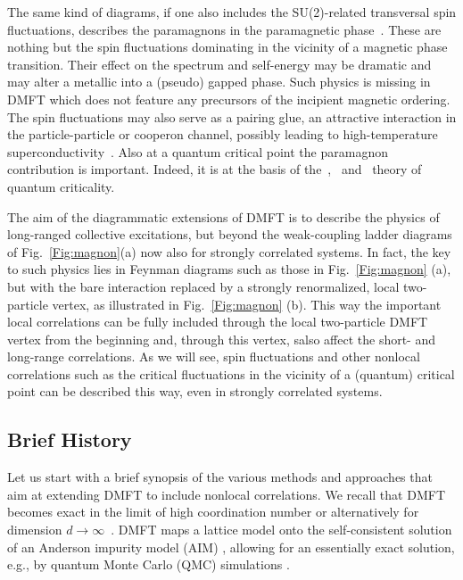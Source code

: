 \documentclass[rmp,aps,reprint,amsmath,amssymb,superscriptaddress,showpacs,nofootinbib]{revtex4-1}
\begin{document}
The same kind of diagrams, if one also includes the SU(2)-related transversal spin fluctuations, describes the paramagnons in the paramagnetic phase~\cite{Moriya1985}. These are nothing but the spin fluctuations dominating in the vicinity of a magnetic phase transition. Their effect on the  spectrum and self-energy may be dramatic and may alter a metallic into a (pseudo) gapped phase. Such physics is missing in DMFT which does not feature any precursors of the incipient  magnetic ordering. The spin fluctuations may also serve as a pairing glue, an attractive interaction in the particle-particle or cooperon channel,  possibly leading to high-temperature superconductivity~\cite{Scalapino12}. Also at a quantum critical point the paramagnon contribution is important. Indeed, it is at the basis of the~,~ and~ theory of quantum criticality.

The aim of the diagrammatic extensions of DMFT is to describe the physics of long-ranged collective excitations, but beyond the weak-coupling ladder diagrams of  Fig.~\ref{Fig:magnon}(a) now also for strongly correlated systems. In fact, the key to such physics lies in Feynman diagrams such as those in  Fig.~\ref{Fig:magnon} (a), but with the bare interaction replaced by a strongly renormalized, local two-particle vertex, as illustrated in Fig.~\ref{Fig:magnon} (b). This way the important local  correlations can be fully included through the local  two-particle DMFT vertex from the beginning and, through this vertex, salso affect the short- and long-range correlations. As we will see, spin fluctuations and other nonlocal correlations such as the critical fluctuations in the vicinity of a (quantum) critical point can be described this way, even in strongly correlated systems.

\subsection{Brief History}
Let us start with a brief synopsis of the various methods and approaches  that aim at extending  DMFT to include nonlocal correlations. We recall that DMFT  becomes exact in the limit of high coordination number or alternatively for dimension $d\rightarrow \infty$~\cite{Metzner1989}. DMFT maps a lattice model onto the self-consistent solution of an Anderson impurity model (AIM) \cite{Georges1992a}, allowing for an essentially exact solution, e.g., by quantum Monte Carlo (QMC) simulations \cite{Jarrell1992}. 
\end{document}
